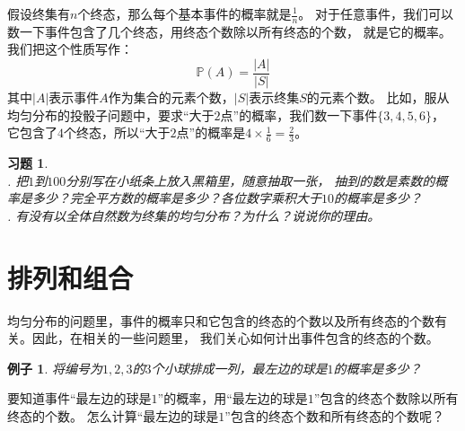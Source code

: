 \documentclass[12pt,UTF8]{ctexbook}
\newtheorem{ex}{例子}[section]
\newtheorem{xt}{习题}[section]
\begin{document}
假设终集有$n$个终态，那么每个基本事件的概率就是$\frac{1}{n}$。
对于任意事件，我们可以数一下事件包含了几个终态，用终态个数除以所有终态的个数，
就是它的概率。我们把这个性质写作：
$$ \mathbb{P}(A) = \frac{|A|}{|S|} $$
其中$|A|$表示事件$A$作为集合的元素个数，$|S|$表示终集$S$的元素个数。 
比如，服从均匀分布的投骰子问题中，要求“大于$2$点”的概率，我们数一下事件$\{3,4,5,6\}$，
它包含了$4$个终态，所以“大于$2$点”的概率是$4 \times \frac{1}{6} = \frac{2}{3}$。

\begin{xt}
    \mbox{} \\
    . 把$1$到$100$分别写在小纸条上放入黑箱里，随意抽取一张，
    抽到的数是素数的概率是多少？完全平方数的概率是多少？各位数字乘积大于$10$的概率是多少？ \\
    . 有没有以全体自然数为终集的均匀分布？为什么？说说你的理由。
\end{xt}



\section{排列和组合}
均匀分布的问题里，事件的概率只和它包含的终态的个数以及所有终态的个数有关。因此，在相关的一些问题里，
我们关心如何计出事件包含的终态的个数。

\begin{ex}
    将编号为$1,2,3$的$3$个小球排成一列，最左边的球是$1$的概率是多少？
\end{ex}
要知道事件“最左边的球是$1$”的概率，用“最左边的球是$1$”包含的终态个数除以所有终态的个数。
怎么计算“最左边的球是$1$”包含的终态个数和所有终态的个数呢？
\end{document}
